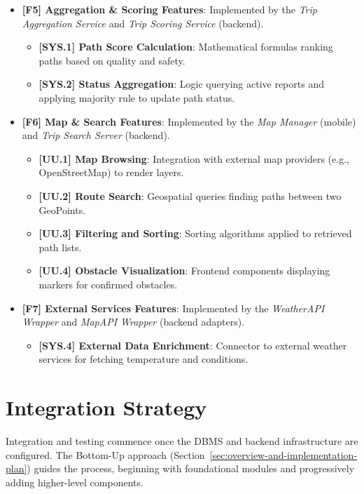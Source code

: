 \begin{itemize}
    \item \textbf{[F5] Aggregation \& Scoring Features}: Implemented by the \textit{Trip Aggregation Service} and \textit{Trip Scoring Service} (backend).
    \begin{itemize}
        \item \textbf{[SYS.1] Path Score Calculation}: Mathematical formulas ranking paths based on quality and safety.
        \item \textbf{[SYS.2] Status Aggregation}: Logic querying active reports and applying majority rule to update path status.
    \end{itemize}
    
    \item \textbf{[F6] Map \& Search Features}: Implemented by the \textit{Map Manager} (mobile) and \textit{Trip Search Server} (backend).
    \begin{itemize}
        \item \textbf{[UU.1] Map Browsing}: Integration with external map providers (e.g., OpenStreetMap) to render layers.
        \item \textbf{[UU.2] Route Search}: Geospatial queries finding paths between two GeoPoints.
        \item \textbf{[UU.3] Filtering and Sorting}: Sorting algorithms applied to retrieved path lists.
        \item \textbf{[UU.4] Obstacle Visualization}: Frontend components displaying markers for confirmed obstacles.
    \end{itemize}
    
    \item \textbf{[F7] External Services Features}: Implemented by the \textit{WeatherAPI Wrapper} and \textit{MapAPI Wrapper} (backend adapters).
    \begin{itemize}
        \item \textbf{[SYS.4] External Data Enrichment}: Connector to external weather services for fetching temperature and conditions.
    \end{itemize}
\end{itemize}

\section{Integration Strategy}
\label{sec:integration-strategy}

Integration and testing commence once the DBMS and backend infrastructure are configured. The Bottom-Up approach (Section~\ref{sec:overview-and-implementation-plan}) guides the process, beginning with foundational modules and progressively adding higher-level components.

